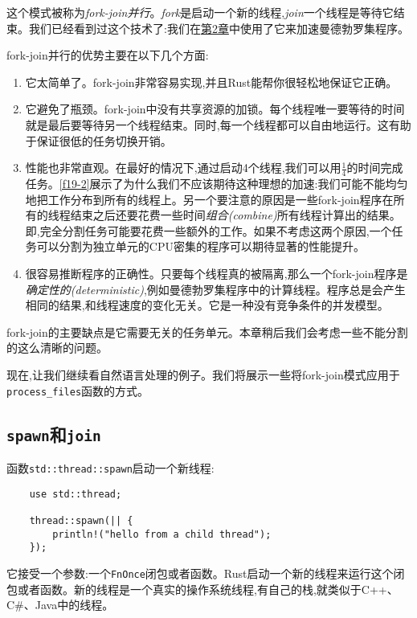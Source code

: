 这个模式被称为\emph{fork-join并行}。\emph{fork}是启动一个新的线程,\emph{join}一个线程是等待它结束。我们已经看到过这个技术了:我们在\hyperref[ch02]{第2章}中使用了它来加速曼德勃罗集程序。

fork-join并行的优势主要在以下几个方面:
\begin{enumerate}
    \item 它太简单了。fork-join非常容易实现,并且Rust能帮你很轻松地保证它正确。
    \item 它避免了瓶颈。fork-join中没有共享资源的加锁。每个线程唯一要等待的时间就是最后要等待另一个线程结束。同时,每一个线程都可以自由地运行。这有助于保证很低的任务切换开销。
    \item 性能也非常直观。在最好的情况下,通过启动4个线程,我们可以用$\frac{1}{4}$的时间完成任务。\autoref{f19-2}展示了为什么我们不应该期待这种理想的加速:我们可能不能均匀地把工作分布到所有的线程上。另一个要注意的原因是一些fork-join程序在所有的线程结束之后还要花费一些时间\emph{组合(combine)}所有线程计算出的结果。即,完全分割任务可能要花费一些额外的工作。如果不考虑这两个原因,一个任务可以分割为独立单元的CPU密集的程序可以期待显著的性能提升。
    \item 很容易推断程序的正确性。只要每个线程真的被隔离,那么一个fork-join程序是\emph{确定性的(deterministic)},例如曼德勃罗集程序中的计算线程。程序总是会产生相同的结果,和线程速度的变化无关。它是一种没有竞争条件的并发模型。
\end{enumerate}

fork-join的主要缺点是它需要无关的任务单元。本章稍后我们会考虑一些不能分割的这么清晰的问题。

现在,让我们继续看自然语言处理的例子。我们将展示一些将fork-join模式应用于\texttt{process\_files}函数的方式。

\subsection{\texttt{spawn}和\texttt{join}}\label{spawn}
函数\texttt{std::thread::spawn}启动一个新线程:
\begin{verbatim}
    use std::thread;

    thread::spawn(|| {
        println!("hello from a child thread");
    });
\end{verbatim}

它接受一个参数:一个\texttt{FnOnce}闭包或者函数。Rust启动一个新的线程来运行这个闭包或者函数。新的线程是一个真实的操作系统线程,有自己的栈,就类似于C++、C\#、Java中的线程。

